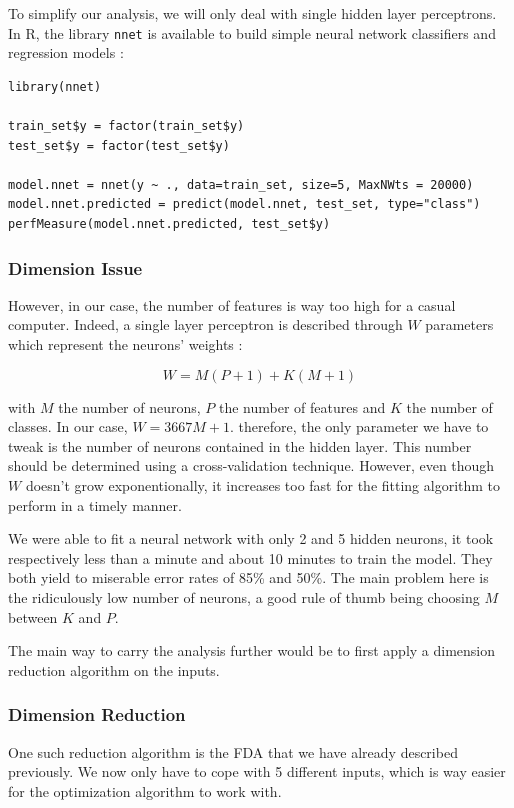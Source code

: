 \documentclass[]{report}
\begin{document}
To simplify our analysis, we will only deal with single hidden layer perceptrons. In R, the library \texttt{nnet} is available to build simple neural network classifiers and regression models : 
\begin{lstlisting}
library(nnet)

train_set$y = factor(train_set$y)
test_set$y = factor(test_set$y)

model.nnet = nnet(y ~ ., data=train_set, size=5, MaxNWts = 20000)
model.nnet.predicted = predict(model.nnet, test_set, type="class")
perfMeasure(model.nnet.predicted, test_set$y)
\end{lstlisting}

\subsubsection{Dimension Issue}

However, in our case, the number of features is way too high for a casual computer. Indeed, a single layer perceptron is described through $W$ parameters which represent the neurons' weights : 

$$
	W = M(P+1) + K(M+1)
$$

with $M$ the number of neurons, $P$ the number of features and $K$ the number of classes. In our case, $W = 3667M + 1$.
 therefore, the only parameter we have to tweak is the number of neurons contained in the hidden layer. This number should be determined using a cross-validation technique. However, even though $W$ doesn't grow exponentionally, it increases too fast for the fitting algorithm to perform in a timely manner. 
 
 We were able to fit a neural network with only 2 and 5 hidden neurons, it took respectively less than a minute and about 10 minutes to train the model. They both yield to miserable error rates of 85\% and 50\%. The main problem here is the ridiculously low number of neurons, a good rule of thumb being choosing $M$ between $K$ and $P$.
 
The main way to carry the analysis further would be to first apply a dimension reduction algorithm on the inputs.

\subsubsection{Dimension Reduction}
One such reduction algorithm is the FDA that we have already described previously. We now only have to cope with 5 different inputs, which is way easier for the optimization algorithm to work with. 
\end{document}
